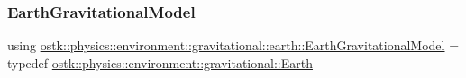 \subsubsection{\texorpdfstring{Earth\+Gravitational\+Model}{EarthGravitationalModel}}
{\footnotesize\ttfamily using \hyperlink{namespaceostk_1_1physics_1_1environment_1_1gravitational_1_1earth_a58cd447cbdfb525cde0bf7d94440990f}{ostk\+::physics\+::environment\+::gravitational\+::earth\+::\+Earth\+Gravitational\+Model} = typedef \hyperlink{classostk_1_1physics_1_1environment_1_1gravitational_1_1_earth}{ostk\+::physics\+::environment\+::gravitational\+::\+Earth}}

